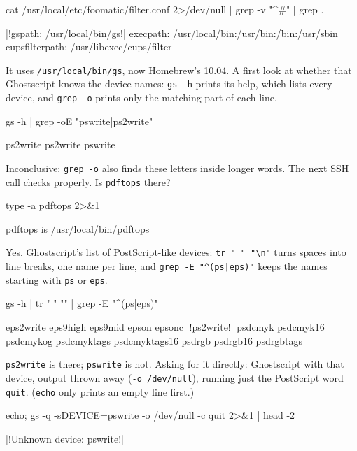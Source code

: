 \documentclass[11pt,a4paper]{article}
\begin{document}
\begin{mine}
cat /usr/local/etc/foomatic/filter.conf 2>/dev/null | grep -v "^#" | grep .
\end{mine}
\begin{cmdout}
|!gspath: /usr/local/bin/gs!|
execpath: /usr/local/bin:/usr/bin:/bin:/usr/sbin
cupsfilterpath: /usr/libexec/cups/filter
\end{cmdout}

It uses \texttt{/usr/local/bin/gs}, now Homebrew's 10.04. A first look at whether that Ghostscript knows the device names: \texttt{gs -h} prints its help, which lists every device, and \texttt{grep -o} prints only the matching part of each line.

\begin{mine}
gs -h | grep -oE "pswrite|ps2write"
\end{mine}
\begin{cmdout}
ps2write
ps2write
pswrite
\end{cmdout}

Inconclusive: \texttt{grep -o} also finds these letters inside longer words. The next SSH call checks properly. Is \texttt{pdftops} there?

\begin{mine}
type -a pdftops 2>&1
\end{mine}
\begin{cmdout}
pdftops is /usr/local/bin/pdftops
\end{cmdout}

Yes. Ghostscript's list of PostScript-like devices: \texttt{tr " " "\textbackslash n"} turns spaces into line breaks, one name per line, and \texttt{grep -E "\^{}(ps|eps)"} keeps the names starting with \texttt{ps} or \texttt{eps}.

\begin{mine}
gs -h | tr " " "\n" | grep -E "^(ps|eps)"
\end{mine}
\begin{cmdout}
eps2write
eps9high
eps9mid
epson
epsonc
|!ps2write!|
psdcmyk
psdcmyk16
psdcmykog
psdcmyktags
psdcmyktags16
psdrgb
psdrgb16
psdrgbtags
\end{cmdout}

\texttt{ps2write} is there; \texttt{pswrite} is not. Asking for it directly: Ghostscript with that device, output thrown away (\texttt{-o /dev/null}), running just the PostScript word \texttt{quit}. (\texttt{echo} only prints an empty line first.)

\begin{mine}
echo; gs -q -sDEVICE=pswrite -o /dev/null -c quit 2>&1 | head -2
\end{mine}
\begin{cmdout}

|!Unknown device: pswrite!|
\end{cmdout}
\end{document}
